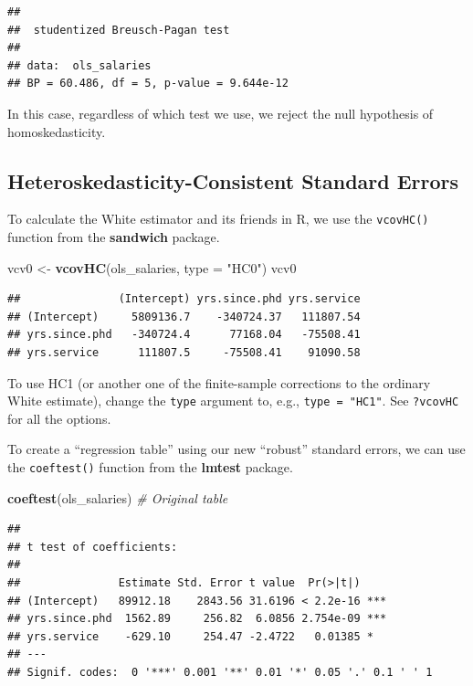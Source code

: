 \documentclass[
  12pt,
  oneside,openany]{book}
\newenvironment{Shaded}{\begin{snugshade}}{\end{snugshade}}
\newcommand{\CommentTok}[1]{\textcolor[rgb]{0.56,0.35,0.01}{\textit{#1}}}
\newcommand{\DataTypeTok}[1]{\textcolor[rgb]{0.13,0.29,0.53}{#1}}
\newcommand{\KeywordTok}[1]{\textcolor[rgb]{0.13,0.29,0.53}{\textbf{#1}}}
\newcommand{\NormalTok}[1]{#1}
\newcommand{\StringTok}[1]{\textcolor[rgb]{0.31,0.60,0.02}{#1}}
\begin{document}
\begin{verbatim}
## 
##  studentized Breusch-Pagan test
## 
## data:  ols_salaries
## BP = 60.486, df = 5, p-value = 9.644e-12
\end{verbatim}

In this case, regardless of which test we use, we reject the null hypothesis of homoskedasticity.

\hypertarget{heteroskedasticity-consistent-standard-errors}{%
\subsection{Heteroskedasticity-Consistent Standard Errors}\label{heteroskedasticity-consistent-standard-errors}}

To calculate the White estimator and its friends in R, we use the \texttt{vcovHC()} function from the \textbf{sandwich} package.

\begin{Shaded}
\begin{Highlighting}[]
\NormalTok{vcv0 <{-}}\StringTok{ }\KeywordTok{vcovHC}\NormalTok{(ols\_salaries, }\DataTypeTok{type =} \StringTok{"HC0"}\NormalTok{)}
\NormalTok{vcv0}
\end{Highlighting}
\end{Shaded}

\begin{verbatim}
##               (Intercept) yrs.since.phd yrs.service
## (Intercept)     5809136.7    -340724.37   111807.54
## yrs.since.phd   -340724.4      77168.04   -75508.41
## yrs.service      111807.5     -75508.41    91090.58
\end{verbatim}

To use HC1 (or another one of the finite-sample corrections to the ordinary White estimate), change the \texttt{type} argument to, e.g., \texttt{type\ =\ "HC1"}. See \texttt{?vcovHC} for all the options.

To create a ``regression table'' using our new ``robust'' standard errors, we can use the \texttt{coeftest()} function from the \textbf{lmtest} package.

\begin{Shaded}
\begin{Highlighting}[]
\KeywordTok{coeftest}\NormalTok{(ols\_salaries)  }\CommentTok{\# Original table}
\end{Highlighting}
\end{Shaded}

\begin{verbatim}
## 
## t test of coefficients:
## 
##               Estimate Std. Error t value  Pr(>|t|)    
## (Intercept)   89912.18    2843.56 31.6196 < 2.2e-16 ***
## yrs.since.phd  1562.89     256.82  6.0856 2.754e-09 ***
## yrs.service    -629.10     254.47 -2.4722   0.01385 *  
## ---
## Signif. codes:  0 '***' 0.001 '**' 0.01 '*' 0.05 '.' 0.1 ' ' 1
\end{verbatim}
\end{document}
